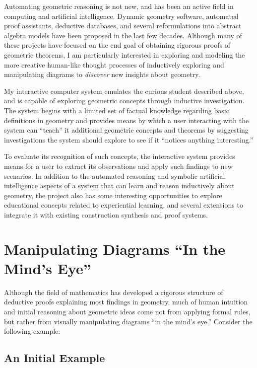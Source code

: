 Automating geometric reasoning is not new, and has been an active
field in computing and artificial intelligence.  Dynamic geometry
software, automated proof assistants, deductive databases, and several
reformulations into abstract algebra models have been proposed in the
last few decades.  Although many of these projects have focused on the
end goal of obtaining rigorous proofs of geometric theorems, I am
particularly interested in exploring and modeling the more creative
human-like thought processes of inductively exploring and manipulating
diagrams to \emph{discover} new insights about geometry.

My interactive computer system emulates the curious student described
above, and is capable of exploring geometric concepts through
inductive investigation.  The system begins with a limited set of
factual knowledge regarding basic definitions in geometry and provides
means by which a user interacting with the system can ``teach'' it
additional geometric concepts and theorems by suggesting
investigations the system should explore to see if it ``notices
anything interesting.''

To evaluate its recognition of such concepts, the interactive system
provides means for a user to extract its observations and apply such
findings to new scenarios.  In addition to the automated reasoning and
symbolic artificial intelligence aspects of a system that can learn
and reason inductively about geometry, the project also has some
interesting opportunities to explore educational concepts related to
experiential learning, and several extensions to integrate it with
existing construction synthesis and proof systems.

\section{Manipulating Diagrams ``In the Mind's Eye''}

Although the field of mathematics has developed a rigorous structure
of deductive proofs explaining most findings in geometry, much of
human intuition and initial reasoning about geometric ideas come not
from applying formal rules, but rather from visually manipulating
diagrams ``in the mind's eye.'' Consider the following example:

\subsection{An Initial Example}

